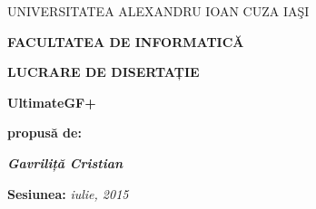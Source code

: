 \documentclass[12pt,english,hidelinks]{article}
\begin{document}
\pagestyle{empty}

\begin{center}
UNIVERSITATEA ALEXANDRU IOAN CUZA IAŞI
\par\end{center}

\begin{center}
\textbf{\large{}FACULTATEA DE INFORMATICĂ}
\par\end{center}{\large \par}

\begin{center}
\vspace{3.5cm}
\par\end{center}

\vspace{2.5cm}


\begin{center}
\textbf{\large{}LUCRARE DE DISERTAȚIE}
\par\end{center}{\large \par}

\smallskip{}


\begin{center}
\textbf{\LARGE{}UltimateGF+}
\par\end{center}{\LARGE \par}

\vspace{1.5cm}


\begin{center}
\textbf{propusă de:}
\par\end{center}

\medskip{}


\begin{center}
\textbf{\textit{\Large{}Gavriliță Cristian}}
\par\end{center}{\Large \par}

\medskip{}


\begin{center}
\textbf{\Large{}Sesiunea: }\textit{\large{}iulie, 2015}
\par\end{center}{\large \par}
\end{document}
